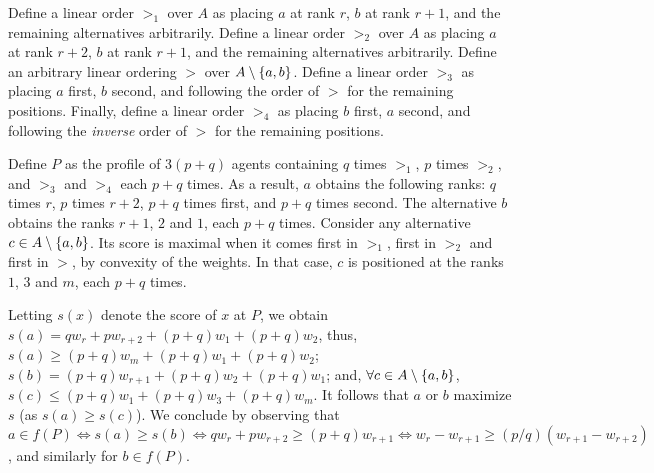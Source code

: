 \documentclass{article}
\begin{document}
\begin{proof*}
	\label{proof:chairQuestions}
	Define a linear order $>_1$ over $A$ as placing $a$ at rank $r$, $b$ at rank $r + 1$, and the remaining alternatives arbitrarily. 
	Define a linear order $>_2$ over $A$ as placing $a$ at rank $r + 2$, $b$ at rank $r + 1$, and the remaining alternatives arbitrarily.
	Define an arbitrary linear ordering $>$ over $A \setminus \{a, b\}$. 
	Define a linear order $>_3$ as placing $a$ first, $b$ second, and following the order of $>$ for the remaining positions.
	Finally, define a linear order $>_4$ as placing $b$ first, $a$ second, and following the \emph{inverse} order of $>$ for the remaining positions.
	
	Define $P$ as the profile of $3 (p + q)$ agents containing $q$ times $>_1$, $p$ times $>_2$, and $>_3$ and $>_4$ each $p + q$ times.
	As a result, $a$ obtains the following ranks: $q$ times $r$, $p$ times $r + 2$, $p + q$ times first, and $p + q$ times second. The alternative $b$ obtains the ranks $r + 1$, $2$ and $1$, each $p + q$ times. Consider any alternative $c \in A \setminus \{a, b\}$. Its score is maximal when it comes first in $>_1$, first in $>_2$ and first in $>$, by convexity of the weights. In that case, $c$ is positioned at the ranks $1$, $3$ and $m$, each $p + q$ times. 
	
	Letting $s(x)$ denote the score of $x$ at $P$, we obtain $s(a) = q w_r + p w_{r + 2} + (p + q) w_1 + (p + q) w_2$, thus, $s(a) ≥ (p + q) w_m + (p + q) w_1 + (p + q) w_2$; $s(b) = (p + q) w_{r + 1} + (p + q) w_2 + (p + q) w_1$; and, $\forall c \in A \setminus \{a, b\}$, 
	$s(c) ≤ (p + q) w_1 + (p + q) w_3 + (p + q) w_m$. It follows that $a$ or $b$ maximize $s$ (as $s(a) ≥ s(c)$). We conclude by observing that $a \in f(P) ⇔ s(a) ≥ s(b) ⇔ q w_r + p w_{r + 2} ≥ (p + q) w_{r + 1} ⇔ w_r - w_{r + 1} ≥ (p / q) (w_{r + 1} - w_{r + 2})$, and similarly for $b \in f(P)$.
\end{proof*}
\end{document}
